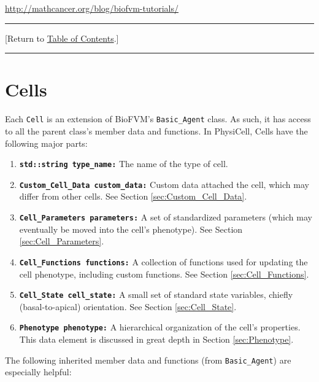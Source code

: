 \documentclass[12pt]{article}
\renewcommand{\v}{\verb}
\newcommand{\smallcode}[1]{\textbf{\texttt{#1}}}
\newcommand{\blue}[1]{\textcolor{blue}{#1}}
\newcommand{\DONE}{}%
\newcommand{\TOClink}{\begin{center}\hrule\vskip-10pt\phantom{.}\hfill[Return to \hyperlink{TOC}{Table of Contents}.]\hfill\phantom{.}\vskip3pt\hrule\end{center}}
\begin{document}
\href{http://mathcancer.org/blog/biofvm-tutorials/}{http://mathcancer.org/blog/biofvm-tutorials/}

\TOClink

\section{Cells \DONE} 
\label{sec:Cells}
Each \v|Cell| is an extension of BioFVM's \v|Basic_Agent| class. As such, 
it has access to all the parent class's member data and functions. In PhysiCell, 
Cells have the following major parts: 

\begin{enumerate}
\item 
\smallcode{std::string type\_name:} The name of the type of cell. 
\item 
\smallcode{Custom\_Cell\_Data custom\_data:} Custom data attached the cell, which may 
differ from other cells. See Section \ref{sec:Custom_Cell_Data}. 

\item 
\smallcode{Cell\_Parameters parameters:} A set of standardized parameters 
(which may eventually be moved into the cell's phenotype). See 
Section \ref{sec:Cell_Parameters}. 

\item 
\smallcode{Cell\_Functions functions:} A collection of functions used for 
updating the cell phenotype, including custom functions. 
See Section \ref{sec:Cell_Functions}. 

\item 
\smallcode{Cell\_State cell\_state:} A small set of standard state variables,
chiefly (basal-to-apical) orientation. See Section 
\ref{sec:Cell_State}. 

\item 
\smallcode{Phenotype phenotype:} A hierarchical organization of the cell's 
properties. This data element is discussed in great depth 
in Section \ref{sec:Phenotype}.  
\end{enumerate} 

The following inherited member data and functions (from \v|Basic_Agent|) 
are especially helpful: 
\end{document}
